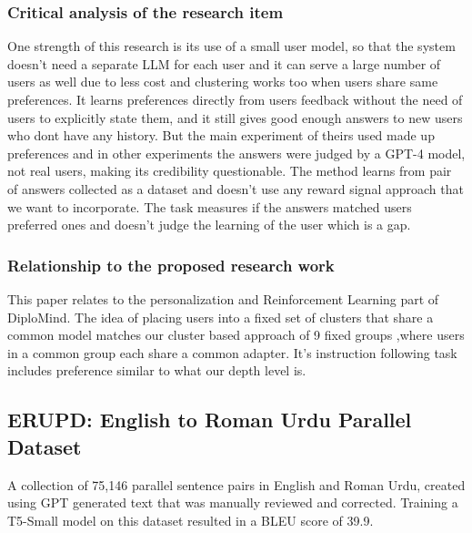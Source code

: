 \documentclass{FastFyp}
\begin{document}
\subsubsection{Critical analysis of the research item}
One strength of this research is its use of a small user model, so that the system doesn't need a separate LLM for each user and it can serve a large number of users as well due to less cost and clustering works too when users share same preferences. It learns preferences directly from users feedback without the need of users to explicitly state them, and it still gives good enough answers to new users who dont have any history. But the main experiment of theirs used made up preferences and in other experiments the answers were judged by a GPT-4 model, not real users, making its credibility questionable. The method learns from pair of answers collected as a dataset and doesn't use any reward signal approach that we want to incorporate. The task measures if the answers matched users preferred ones and doesn't judge the learning of the user which is a gap.

\subsubsection{Relationship to the proposed research work}
This paper relates to the personalization and Reinforcement Learning part of DiploMind. The idea of placing users into a fixed set of clusters that share a common model matches our cluster based approach of 9 fixed groups ,where users in a common group each share a common adapter. It's instruction following task includes preference similar to what our depth level is.

\subsection{ERUPD: English to Roman Urdu Parallel Dataset}
A collection of 75,146 parallel sentence pairs in English and Roman Urdu, created using GPT generated text that was manually reviewed and corrected. Training a T5-Small model on this dataset resulted in a BLEU score of 39.9.
\end{document}
